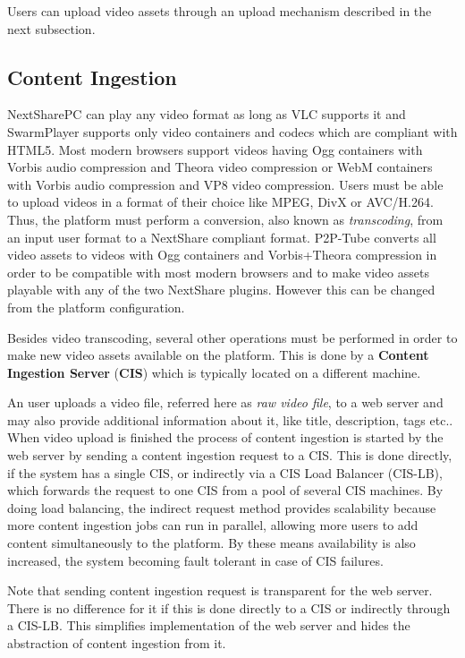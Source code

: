 Users can upload video assets through an upload mechanism described in the next subsection.

\subsection{Content Ingestion}
\label{subsec:content-ingestion}

NextSharePC can play any video format as long as VLC supports it and SwarmPlayer supports only video containers and codecs which are compliant with HTML5. Most modern browsers support videos having Ogg containers with Vorbis audio compression and Theora video compression or WebM containers with Vorbis audio compression and VP8 video compression. Users must be able to upload videos in a format of their choice like MPEG, DivX or AVC/H.264. Thus, the platform must perform a conversion, also known as \textit{transcoding}, from an input user format to a NextShare compliant format. P2P-Tube converts all video assets to videos with Ogg containers and Vorbis+Theora compression in order to be compatible with most modern browsers and to make video assets playable with any of the two NextShare plugins. However this can be changed from the platform configuration.

Besides video transcoding, several other operations must be performed in order to make new video assets available on the platform. This is done by a \textbf{Content Ingestion Server} (\textbf{CIS}) which is typically located on a different machine.

An user uploads a video file, referred here as \textit{raw video file}, to a web server and may also provide additional information about it, like title, description, tags etc.. When video upload is finished the process of content ingestion is started by the web server by sending a content ingestion request to a CIS. This is done directly, if the system has a single CIS, or indirectly via a CIS Load Balancer (CIS-LB), which forwards the request to one CIS from a pool of several CIS machines. By doing load balancing, the indirect request method provides scalability because more content ingestion jobs can run in parallel, allowing more users to add content simultaneously to the platform. By these means availability is also increased, the system becoming fault tolerant in case of CIS failures.

Note that sending content ingestion request is transparent for the web server. There is no difference for it if this is done directly to a CIS or indirectly through a CIS-LB. This simplifies implementation of the web server and hides the abstraction of content ingestion from it.

